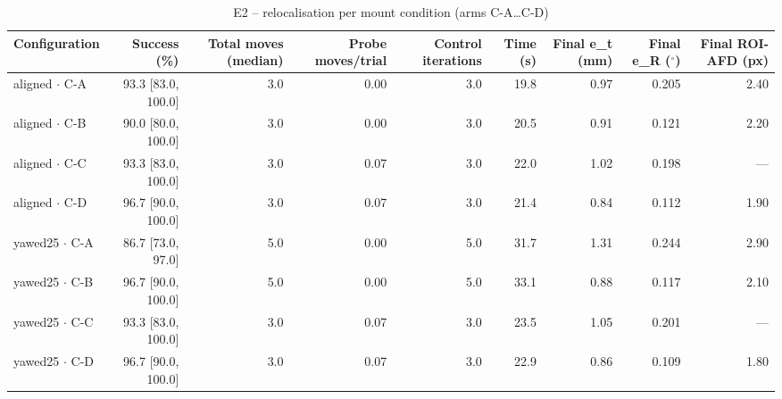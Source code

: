 \begin{table}[t]
\centering
\caption{E2 – relocalisation per mount condition (arms C-A…C-D)}
\label{tab:e2}
\begin{tabular}{lrrrrrrrr}
\toprule
Configuration & Success (\%) & Total moves (median) & Probe moves/trial & Control iterations & Time (s) & Final e\_t (mm) & Final e\_R ($^\circ$) & Final ROI-AFD (px) \\
\midrule
aligned $\cdot$ C-A & 93.3 [83.0, 100.0] & 3.0 & 0.00 & 3.0 & 19.8 & 0.97 & 0.205 & 2.40 \\
aligned $\cdot$ C-B & 90.0 [80.0, 100.0] & 3.0 & 0.00 & 3.0 & 20.5 & 0.91 & 0.121 & 2.20 \\
aligned $\cdot$ C-C & 93.3 [83.0, 100.0] & 3.0 & 0.07 & 3.0 & 22.0 & 1.02 & 0.198 & --- \\
aligned $\cdot$ C-D & 96.7 [90.0, 100.0] & 3.0 & 0.07 & 3.0 & 21.4 & 0.84 & 0.112 & 1.90 \\
yawed25 $\cdot$ C-A & 86.7 [73.0, 97.0] & 5.0 & 0.00 & 5.0 & 31.7 & 1.31 & 0.244 & 2.90 \\
yawed25 $\cdot$ C-B & 96.7 [90.0, 100.0] & 5.0 & 0.00 & 5.0 & 33.1 & 0.88 & 0.117 & 2.10 \\
yawed25 $\cdot$ C-C & 93.3 [83.0, 100.0] & 3.0 & 0.07 & 3.0 & 23.5 & 1.05 & 0.201 & --- \\
yawed25 $\cdot$ C-D & 96.7 [90.0, 100.0] & 3.0 & 0.07 & 3.0 & 22.9 & 0.86 & 0.109 & 1.80 \\
\bottomrule
\end{tabular}
\end{table}
